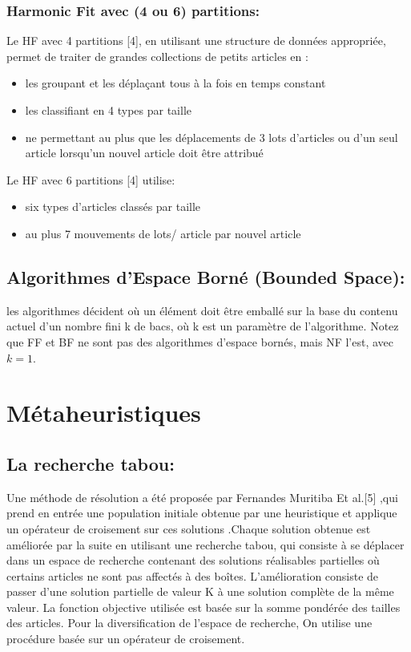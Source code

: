 \documentclass[class=report, crop=false]{standalone}
\begin{document}
        \subsubsection{Harmonic Fit avec (4 ou 6) partitions: }
        Le HF avec 4 partitions [4], en utilisant une structure de données appropriée, permet de traiter de grandes collections de petits articles en :
        \renewcommand{\labelitemi}{$\circ$}  
        \begin{itemize}
            \item les groupant et les déplaçant tous à la fois en temps constant
            \item les classifiant en 4 types par taille
            \item ne permettant au plus que les déplacements de 3 lots d’articles ou d'un seul article lorsqu'un nouvel article doit être attribué
        \end{itemize}
        Le HF avec 6 partitions [4] utilise:
        \renewcommand{\labelitemi}{$\circ$}  
        \begin{itemize}
            \item six types d'articles classés par taille
            \item au plus 7 mouvements de lots/ article par nouvel article
        \end{itemize}
        \subsection{Algorithmes d’Espace Borné (Bounded Space):}
        les algorithmes décident où un élément doit être emballé sur la base du contenu actuel d'un nombre fini k de bacs, où k est un paramètre de l'algorithme. Notez que FF et BF ne sont pas des algorithmes d'espace bornés, mais NF l'est, avec \(k = 1\).
        \section{Métaheuristiques}
        \subsection{La recherche tabou: }
        Une méthode de résolution a été proposée par Fernandes Muritiba Et al.[5] ,qui prend en entrée une population initiale obtenue par une heuristique et applique un opérateur de croisement sur ces solutions .Chaque solution obtenue est améliorée par la suite en utilisant une recherche tabou, qui consiste à  se déplacer dans un espace de recherche contenant des solutions réalisables  partielles où certains articles ne sont pas affectés à des boîtes. L’amélioration consiste de passer d’une solution partielle de valeur K à une solution complète de la même valeur. La fonction objective utilisée est basée sur la somme pondérée des tailles des articles.
Pour la diversification de l’espace de recherche, On utilise une procédure basée sur un opérateur de croisement.
\end{document}
